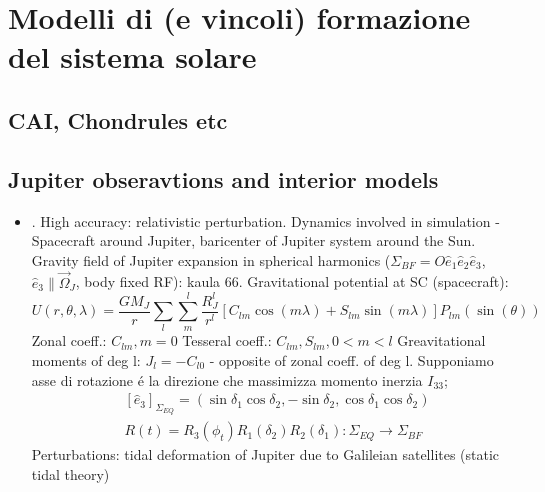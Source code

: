 \documentclass[main.tex]{subfiles}
\begin{document}
\newrefcontext[sorting=hot]

{\let\clearpage\relax
\chapter{Modelli di (e vincoli) formazione del sistema solare}
}

\begin{refsection}
\begingroup
\nocite{*}
\let\clearpage\relax
\printbibliography[filter={pps},heading=bibintoc,title={\textcolor{antiquefuchsia}{Vincoli a formazione planetaria da modelli/osservazioni formazione sistema solare}}]
\printbibliography[filter={pps},check=bibsearchdef,heading=bibintoc,title={\textcolor{antiquefuchsia}{Bib research}}]
\endgroup
\end{refsection}

\section{CAI, Chondrules etc}

\section{Jupiter obseravtions and interior models}

\begin{itemize}
    \item \cite{serra2016gravimetry}. High accuracy: relativistic perturbation. Dynamics involved in simulation - Spacecraft around Jupiter, baricenter of Jupiter system around the Sun. Gravity field of Jupiter expansion in spherical harmonics ($\Sigma_{BF}=O\hat{e}_1\hat{e}_2\hat{e}_3$, $\hat{e}_3\parallel\vec{\Omega}_J$,  body fixed RF): kaula 66. Gravitational potential at SC (spacecraft):
    \begin{equation*}
    U(r,\theta,\lambda)=\frac{GM_J}{r}\sum_l\sum_m^l\frac{R_J^l}{r^l}[C_{lm}\cos{(m\lambda)}+S_{lm}\sin{(m\lambda)}]P_{lm}(\sin{(\theta)})
    \end{equation*}
    Zonal coeff.: $C_{lm}, m=0$
    Tesseral coeff.: $C_{lm}, S_{lm}, 0<m<l$
    Greavitational moments of deg l: $J_l=-C_{l0}$ - opposite of zonal coeff. of deg l.
    Supponiamo asse di rotazione \'e la direzione che massimizza momento inerzia $I_{33}$;
    \begin{align*}
    &[\hat{e}_3]_{\Sigma_{EQ}}=(\sin{\delta_1}\cos{\delta_2},-\sin{\delta_2},\cos{\delta_1}\cos{\delta_2})\\
    &R(t)=R_3(\phi_t)R_1(\delta_2)R_2(\delta_1): \Sigma_{EQ}\to\Sigma_{BF}
    \end{align*}
    Perturbations: tidal deformation of Jupiter due to Galileian satellites (static tidal theory)
\end{itemize}
\end{document}
